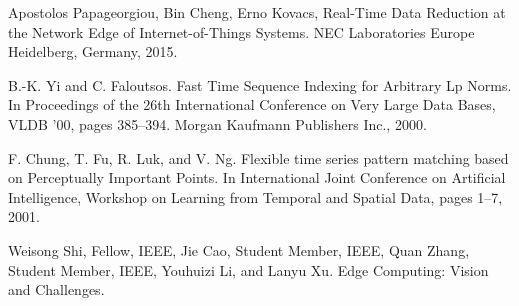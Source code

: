 \documentclass[11pt,journal, a4paper]{IEEEtran}
\begin{document}
\begin{thebibliography}{5}


 Apostolos Papageorgiou, Bin Cheng, Erno Kovacs, Real-Time Data Reduction at the Network Edge of Internet-of-Things Systems. NEC Laboratories Europe Heidelberg, Germany, 2015.

B.-K. Yi and C. Faloutsos. Fast Time Sequence Indexing for Arbitrary
Lp Norms. In Proceedings of the 26th International Conference on
Very Large Data Bases, VLDB ’00, pages 385–394. Morgan Kaufmann
Publishers Inc., 2000.

F. Chung, T. Fu, R. Luk, and V. Ng. Flexible time series pattern
matching based on Perceptually Important Points. In International
Joint Conference on Artificial Intelligence, Workshop on Learning from
Temporal and Spatial Data, pages 1–7, 2001.


Weisong Shi, Fellow, IEEE, Jie Cao, Student Member, IEEE, Quan Zhang, Student Member, IEEE, Youhuizi Li, and Lanyu Xu. Edge Computing: Vision and Challenges. 






\end{thebibliography}
\end{document}
